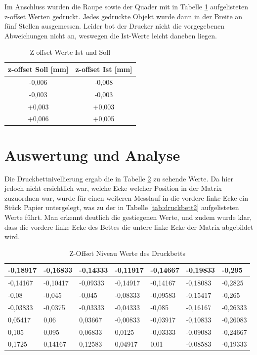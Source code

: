 \documentclass[a4paper,12pt,bibtotocnumbered]{scrartcl}
\numberwithin{equation}{section} %
\begin{document}
Im Anschluss wurden die Raupe sowie der Quader mit in Tabelle \ref*{tab:z-offset} aufgelisteten z-offset Werten gedruckt. Jedes gedruckte Objekt wurde dann in der Breite an fünf Stellen ausgemessen. Leider bot der Drucker nicht die vorgegebenen Abweichungen nicht an, weswegen die Ist-Werte leicht daneben liegen.  

\bgroup
\def\arraystretch{1.6}%
\begin{table}[H]
\centering
\label{tab:z-offset}
\begin{tabular}{|c|c|}
\hline
z-offset Soll {[}mm{]} & z-offset Ist {[}mm{]} \\ \hline
-0,006                 & -0,008                \\ \hline
-0,003                 & -0,003                \\ \hline
+0,003                 & +0,003                \\ \hline
+0,006                 & +0,005                \\ \hline
\end{tabular}
\caption{Z-offset Werte Ist und Soll}
\end{table}
\egroup

\section[Auswertung und Analyse]{Auswertung und Analyse}
Die Druckbettnivellierung ergab die in Tabelle \ref*{tab:druckbett1} zu sehende Werte. Da hier jedoch nicht ersichtlich war, welche Ecke welcher Position in der Matrix zuzuordnen war, wurde für einen weiteren Messlauf in die vordere linke Ecke ein Stück Papier untergelegt, was zu der in Tabelle \ref*{tab:druckbett2} aufgelisteten Werte führt. Man erkennt deutlich die gestiegenen Werte, und zudem wurde klar, dass die vordere linke Ecke des Bettes die untere linke Ecke der Matrix abgebildet wird. 

\begin{table}[H]
\centering
\caption{Z-Offset Niveau Werte des Druckbetts}
\label{tab:druckbett1}
\begin{tabular}{|l|l|l|l|l|l|l|}
\hline
-0,18917 & -0,16833 & -0,14333 & -0,11917 & -0,14667 & -0,19833 & -0,295   \\ \hline
-0,14167 & -0,10417 & -0,09333 & -0,14917 & -0,14167 & -0,18083 & -0,2825  \\ \hline
-0,08    & -0,045   & -0,045   & -0,08333 & -0,09583 & -0,15417 & -0,265   \\ \hline
-0,03833 & -0,0375  & -0,03333 & -0,04333 & -0,085   & -0,16167 & -0,26333 \\ \hline
0,05417  & 0,06     & 0,03667  & -0,00833 & -0,03917 & -0,10833 & -0,26083 \\ \hline
0,105    & 0,095    & 0,06833  & 0,0125   & -0,03333 & -0,09083 & -0,24667 \\ \hline
0,1725   & 0,14167  & 0,12583  & 0,04917  & 0,01     & -0,08583 & -0,19333 \\ \hline
\end{tabular}
\end{table}
\end{document}
